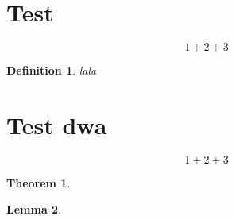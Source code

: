 \documentclass[]{article}
\numberwithin{equation}{section} %
\newtheorem{theorem}{Theorem}
\newtheorem{lemma}[theorem]{Lemma} %
\numberwithin{theorem}{section}
\newtheorem{definition}{Definition}[section] %
\begin{document}
\section{Test}
\begin{equation}
    1+2+3
\end{equation}
\begin{definition}
lala
\end{definition}
\section{Test dwa}
\begin{equation}
    1+2+3
\end{equation}
\begin{theorem}
\end{theorem}
\begin{lemma}
\end{lemma}
\end{document}
